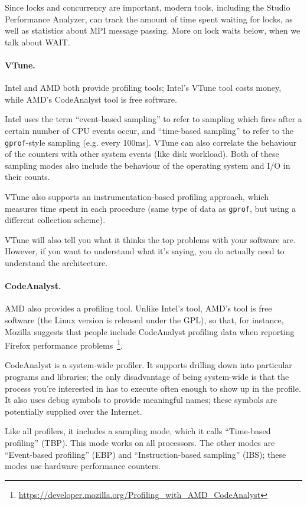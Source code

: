 \documentclass[a4paper]{report}
\begin{document}
Since locks and concurrency are important, modern tools, including the
Studio Performance Analyzer, can track the amount of time spent
waiting for locks, as well as statistics about MPI message
passing. More on lock waits below, when we talk about WAIT.

\paragraph{VTune.} Intel and AMD both provide profiling
tools; Intel's VTune tool costs money, while AMD's CodeAnalyst tool is
free software.

Intel uses the term ``event-based sampling'' to refer to sampling 
which fires after a certain number of CPU events occur, and ``time-based
sampling'' to refer to the {\tt gprof}-style sampling (e.g. every 100ms).
VTune can also correlate the behaviour of the counters with other
system events (like disk workload). Both of these sampling modes
also include the behaviour of the operating system and I/O in their
counts.

VTune also supports an instrumentation-based profiling approach,
which measures time spent in each procedure (same type of
data as {\tt gprof}, but using a different collection scheme).

VTune will also tell you what it thinks the top problems with your
software are. However, if you want to understand what it's saying,
you do actually need to understand the architecture.

\paragraph{CodeAnalyst.} AMD also provides a profiling tool. Unlike Intel's tool, AMD's tool is
free software (the Linux version is released under the GPL), so that,
for instance, Mozilla suggests that people include CodeAnalyst
profiling data when reporting Firefox performance
problems~\footnote{\url{https://developer.mozilla.org/Profiling_with_AMD_CodeAnalyst}}.

CodeAnalyst is a system-wide profiler. It supports drilling down into
particular programs and libraries; the only disadvantage of being
system-wide is that the process you're interested in has to execute
often enough to show up in the profile. It also uses debug symbols to
provide meaningful names; these symbols are potentially supplied over
the Internet.

Like all profilers, it includes a sampling mode, which it calls ``Time-based
profiling'' (TBP). This mode works on all processors. The other modes are 
``Event-based profiling'' (EBP) and ``Instruction-based sampling'' (IBS);
these modes use hardware performance counters.
\end{document}
